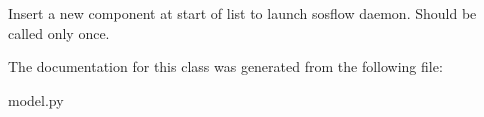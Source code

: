 \begin{DoxyVerb}Insert a new component at start of list to launch sosflow daemon.
Should be called only once.\end{DoxyVerb}
 

The documentation for this class was generated from the following file\+:\begin{DoxyCompactItemize}
\item 
model.\+py\end{DoxyCompactItemize}
